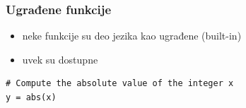 \documentclass[compress]{beamer}
\begin{document}
\begin{frame}[fragile]
\frametitle{Ugrađene funkcije}
\begin{itemize}
  \item neke funkcije su deo jezika kao ugrađene (built-in)
  \item uvek su dostupne
\end{itemize}
\begin{verbatim}
# Compute the absolute value of the integer x
y = abs(x)
\end{verbatim}
\end{frame}
  
\end{document}

